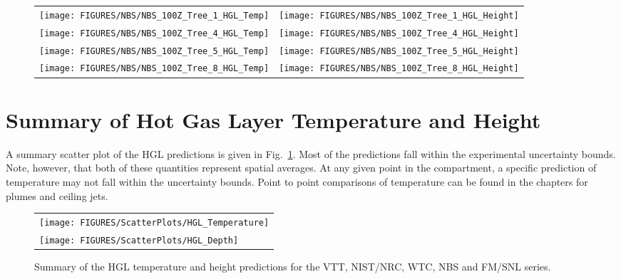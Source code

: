 \begin{figure}[p]
\begin{tabular*}{\textwidth}{l@{\extracolsep{\fill}}r}
\texttt{[image: FIGURES/NBS/NBS\_100Z\_Tree\_1\_HGL\_Temp]} &
\texttt{[image: FIGURES/NBS/NBS\_100Z\_Tree\_1\_HGL\_Height]} \\
\texttt{[image: FIGURES/NBS/NBS\_100Z\_Tree\_4\_HGL\_Temp]} &
\texttt{[image: FIGURES/NBS/NBS\_100Z\_Tree\_4\_HGL\_Height]} \\
\texttt{[image: FIGURES/NBS/NBS\_100Z\_Tree\_5\_HGL\_Temp]} &
\texttt{[image: FIGURES/NBS/NBS\_100Z\_Tree\_5\_HGL\_Height]} \\
\texttt{[image: FIGURES/NBS/NBS\_100Z\_Tree\_8\_HGL\_Temp]} &
\texttt{[image: FIGURES/NBS/NBS\_100Z\_Tree\_8\_HGL\_Height]}
\end{tabular*}
\end{figure}

\clearpage



\section{Summary of Hot Gas Layer Temperature and Height}

A summary scatter plot of the HGL predictions is given in Fig.~\ref{HGL_Summary}. Most of the predictions fall
within the experimental uncertainty bounds. Note, however, that both of these quantities represent spatial
averages. At any given point in the compartment, a specific prediction of temperature may not fall within
the uncertainty bounds. Point to point comparisons of temperature can be found in the chapters for plumes and
ceiling jets.

\newpage

\begin{figure}[p]
\begin{center}
\begin{tabular}{l}
\texttt{[image: FIGURES/ScatterPlots/HGL\_Temperature]} \\
\texttt{[image: FIGURES/ScatterPlots/HGL\_Depth]}
\end{tabular}
\end{center}
\caption[Summary of HGL temperature and height predictions, VTT, NIST/NRC, WTC, NBS and FM/SNL series]
{Summary of the HGL temperature and height predictions for the VTT, NIST/NRC, WTC, NBS and FM/SNL series.}
\label{HGL_Summary}
\end{figure}



